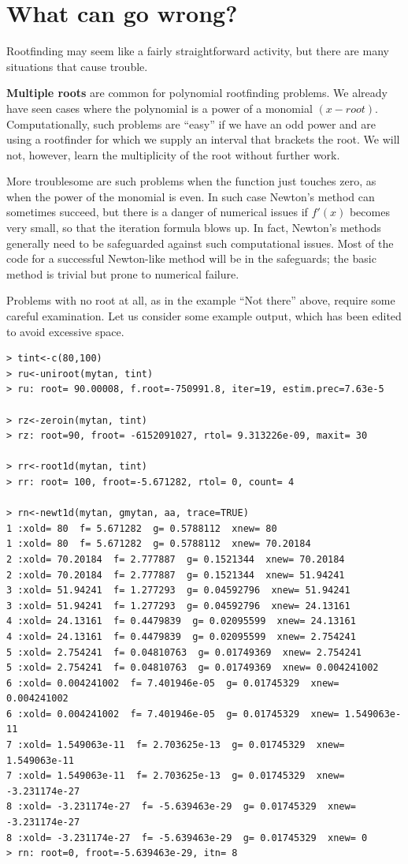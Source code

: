 \documentclass[11pt,letterpaper]{article}
\begin{document}
\section{What can go wrong?}

Rootfinding may seem like a fairly straightforward activity, but there are many 
situations that cause trouble.

\textbf{Multiple roots} are common for polynomial rootfinding problems. We already have
seen cases where the polynomial is a power of a monomial $(x-root)$. Computationally,
such problems are ``easy'' if we have an odd power and are using a rootfinder for
which we supply an interval that brackets the root. We will not, however, learn the
multiplicity of the root without further work. 

More troublesome are such problems when the function just touches zero, as when the
power of the monomial is even. In such case Newton's method can sometimes succeed,
but there is a danger of numerical issues if $f'(x)$ becomes very small, so that the
iteration formula blows up. In fact, Newton's methods generally need to be safeguarded
against such computational issues. Most of the code for a successful Newton-like 
method will be in the safeguards; the basic method is trivial but prone to numerical
failure.

Problems with no root at all, as in the example ``Not there'' above, require some
careful examination. Let us consider some example output, which has been edited to
avoid excessive space.

\begin{verbatim}
> tint<-c(80,100)
> ru<-uniroot(mytan, tint)
> ru: root= 90.00008, f.root=-750991.8, iter=19, estim.prec=7.63e-5

> rz<-zeroin(mytan, tint)
> rz: root=90, froot= -6152091027, rtol= 9.313226e-09, maxit= 30

> rr<-root1d(mytan, tint)
> rr: root= 100, froot=-5.671282, rtol= 0, count= 4

> rn<-newt1d(mytan, gmytan, aa, trace=TRUE)
1 :xold= 80  f= 5.671282  g= 0.5788112  xnew= 80 
1 :xold= 80  f= 5.671282  g= 0.5788112  xnew= 70.20184 
2 :xold= 70.20184  f= 2.777887  g= 0.1521344  xnew= 70.20184 
2 :xold= 70.20184  f= 2.777887  g= 0.1521344  xnew= 51.94241 
3 :xold= 51.94241  f= 1.277293  g= 0.04592796  xnew= 51.94241 
3 :xold= 51.94241  f= 1.277293  g= 0.04592796  xnew= 24.13161 
4 :xold= 24.13161  f= 0.4479839  g= 0.02095599  xnew= 24.13161 
4 :xold= 24.13161  f= 0.4479839  g= 0.02095599  xnew= 2.754241 
5 :xold= 2.754241  f= 0.04810763  g= 0.01749369  xnew= 2.754241 
5 :xold= 2.754241  f= 0.04810763  g= 0.01749369  xnew= 0.004241002 
6 :xold= 0.004241002  f= 7.401946e-05  g= 0.01745329  xnew= 0.004241002 
6 :xold= 0.004241002  f= 7.401946e-05  g= 0.01745329  xnew= 1.549063e-11 
7 :xold= 1.549063e-11  f= 2.703625e-13  g= 0.01745329  xnew= 1.549063e-11 
7 :xold= 1.549063e-11  f= 2.703625e-13  g= 0.01745329  xnew= -3.231174e-27 
8 :xold= -3.231174e-27  f= -5.639463e-29  g= 0.01745329  xnew= -3.231174e-27 
8 :xold= -3.231174e-27  f= -5.639463e-29  g= 0.01745329  xnew= 0 
> rn: root=0, froot=-5.639463e-29, itn= 8 
\end{verbatim}
\end{document}

